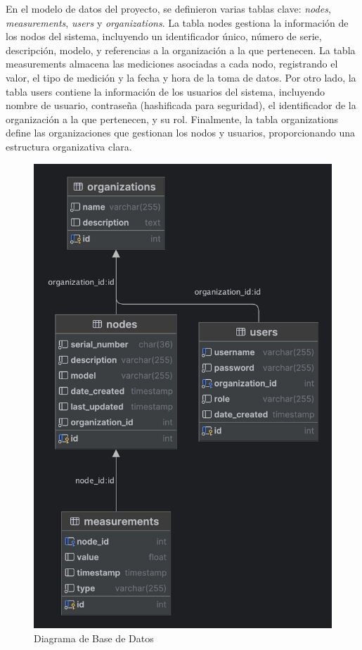 {En el modelo de datos del proyecto, se definieron varias tablas clave: \textit{nodes}, \textit{measurements}, \textit{users} y \textit{organizations}. La tabla nodes gestiona la información de los nodos del sistema, incluyendo un identificador único, número de serie, descripción, modelo, y referencias a la organización a la que pertenecen. La tabla measurements almacena las mediciones asociadas a cada nodo, registrando el valor, el tipo de medición y la fecha y hora de la toma de datos. Por otro lado, la tabla users contiene la información de los usuarios del sistema, incluyendo nombre de usuario, contraseña (hashificada para seguridad), el identificador de la organización a la que pertenecen, y su rol. Finalmente, la tabla organizations define las organizaciones que gestionan los nodos y usuarios, proporcionando una estructura organizativa clara.

\begin{figure}[H]
	\centering
	\includegraphics[scale=.2]{./Figures/PortalWeb/smartcompost_db.png}
	\caption{Diagrama de Base de Datos}
	\label{fig:db_diagram}
\end{figure}

}
